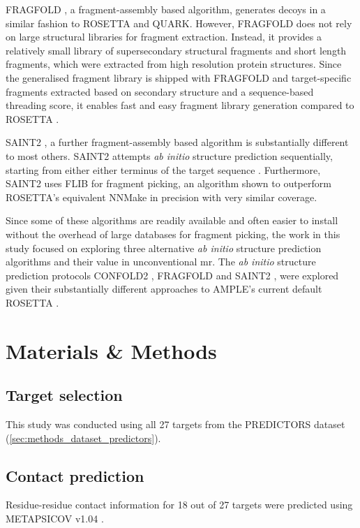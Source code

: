 FRAGFOLD \cite{Jones2001-mc}, a fragment-assembly based algorithm, generates decoys in a similar fashion to ROSETTA and QUARK. However, FRAGFOLD does not rely on large structural libraries for fragment extraction. Instead, it provides a relatively small library of supersecondary structural fragments and short length fragments, which were extracted from high resolution protein structures. Since the generalised fragment library is shipped with FRAGFOLD and target-specific fragments extracted based on secondary structure and a sequence-based threading score, it enables fast and easy fragment library generation compared to ROSETTA \cite{Kosciolek2014-bt}.

SAINT2 \cite{De_Oliveira2017-sg}, a further fragment-assembly based algorithm is substantially different to most others. SAINT2 attempts \textit{ab initio} structure prediction sequentially, starting from either either terminus of the target sequence \cite{De_Oliveira2017-sg}. Furthermore, SAINT2 uses FLIB \cite{De_Oliveira2015-kb} for fragment picking, an algorithm shown to outperform ROSETTA's equivalent NNMake \cite{Gront2011-sv} in precision with very similar coverage. 

Since some of these algorithms are readily available and often easier to install without the overhead of large databases for fragment picking, the work in this study focused on exploring three alternative \textit{ab initio} structure prediction algorithms and their value in unconventional \gls{mr}. The \textit{ab initio} structure prediction protocols CONFOLD2 \cite{Adhikari2018-lj}, FRAGFOLD \cite{Jones2001-mc} and SAINT2 \cite{De_Oliveira2017-sg}, were explored given their substantially different approaches to AMPLE's current default ROSETTA \cite{Rohl2004-dj}.

\section{Materials \& Methods}
\subsection{Target selection}
This study was conducted using all 27 targets from the PREDICTORS dataset (\cref{sec:methods_dataset_predictors}). 

\subsection{Contact prediction}
Residue-residue contact information for 18 out of 27 targets were predicted using METAPSICOV v1.04 \cite{Jones2015-vq}. 

